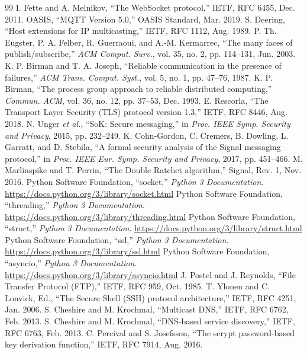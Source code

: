 \documentclass[conference]{IEEEtran}
\begin{document}
\begin{thebibliography}{99}
 I. Fette and A. Melnikov, ``The WebSocket protocol,'' IETF, RFC 6455, Dec. 2011.
 OASIS, ``MQTT Version 5.0,'' OASIS Standard, Mar. 2019.
 S. Deering, ``Host extensions for IP multicasting,'' IETF, RFC 1112, Aug. 1989.
 P. Th. Eugster, P. A. Felber, R. Guerraoui, and A.-M. Kermarrec, ``The many faces of publish/subscribe,'' \emph{ACM Comput. Surv.}, vol. 35, no. 2, pp. 114--131, Jun. 2003.
 K. P. Birman and T. A. Joseph, ``Reliable communication in the presence of failures,'' \emph{ACM Trans. Comput. Syst.}, vol. 5, no. 1, pp. 47--76, 1987.
 K. P. Birman, ``The process group approach to reliable distributed computing,'' \emph{Commun. ACM}, vol. 36, no. 12, pp. 37--53, Dec. 1993.
 E. Rescorla, ``The Transport Layer Security (TLS) protocol version 1.3,'' IETF, RFC 8446, Aug. 2018.
 N. Unger \emph{et al.}, ``SoK: Secure messaging,'' in \emph{Proc. IEEE Symp. Security and Privacy}, 2015, pp. 232--249.
 K. Cohn-Gordon, C. Cremers, B. Dowling, L. Garratt, and D. Stebila, ``A formal security analysis of the Signal messaging protocol,'' in \emph{Proc. IEEE Eur. Symp. Security and Privacy}, 2017, pp. 451--466.
 M. Marlinspike and T. Perrin, ``The Double Ratchet algorithm,'' Signal, Rev. 1, Nov. 2016.
 Python Software Foundation, ``socket,'' \emph{Python 3 Documentation}. \url{https://docs.python.org/3/library/socket.html}
 Python Software Foundation, ``threading,'' \emph{Python 3 Documentation}. \url{https://docs.python.org/3/library/threading.html}
 Python Software Foundation, ``struct,'' \emph{Python 3 Documentation}. \url{https://docs.python.org/3/library/struct.html}
 Python Software Foundation, ``ssl,'' \emph{Python 3 Documentation}. \url{https://docs.python.org/3/library/ssl.html}
 Python Software Foundation, ``asyncio,'' \emph{Python 3 Documentation}. \url{https://docs.python.org/3/library/asyncio.html}
 J. Postel and J. Reynolds, ``File Transfer Protocol (FTP),'' IETF, RFC 959, Oct. 1985.
 T. Ylonen and C. Lonvick, Ed., ``The Secure Shell (SSH) protocol architecture,'' IETF, RFC 4251, Jan. 2006.
 S. Cheshire and M. Krochmal, ``Multicast DNS,'' IETF, RFC 6762, Feb. 2013.
 S. Cheshire and M. Krochmal, ``DNS-based service discovery,'' IETF, RFC 6763, Feb. 2013.
 C. Percival and S. Josefsson, ``The scrypt password-based key derivation function,'' IETF, RFC 7914, Aug. 2016.

\end{thebibliography}
\end{document}
